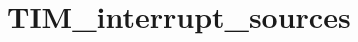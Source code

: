 \hypertarget{group___t_i_m__interrupt__sources}{\section{T\-I\-M\-\_\-interrupt\-\_\-sources}
\label{group___t_i_m__interrupt__sources}
}
